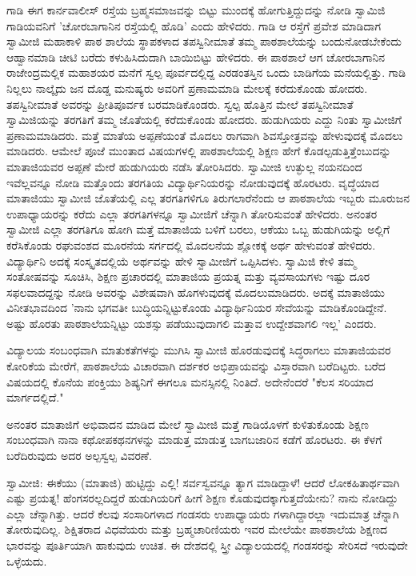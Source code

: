 ಗಾಡಿ ಈಗ ಕಾರ್ನವಾಲೀಸ್ ರಸ್ತೆಯ ಬ್ರಹ್ಮಸಮಾಜವನ್ನು ಬಿಟ್ಟು ಮುಂದಕ್ಕೆ ಹೋಗುತ್ತಿದ್ದುದನ್ನು ನೋಡಿ ಸ್ವಾಮಿಜಿ ಗಾಡಿಯವನಿಗೆ 'ಚೋರಬಾಗಾನಿನ ರಸ್ತೆಯಲ್ಲಿ ಹೊಡಿ' ಎಂದು ಹೇಳಿದರು. ಗಾಡಿ ಆ ರಸ್ತೆಗೆ ಪ್ರವೇಶ ಮಾಡಿದಾಗ ಸ್ವಾಮೀಜಿ ಮಹಾಕಾಳಿ ಪಾಠ ಶಾಲೆಯ ಸ್ಥಾಪಕಳಾದ ತಪಸ್ವಿನೀಮಾತೆ ತಮ್ಮ ಪಾಠಶಾಲೆಯನ್ನು ಬಂದುನೋಡಬೇಕೆಂದು ಆಹ್ವಾನಮಾಡಿ ಚೀಟಿ ಬರೆದು ಕಳುಹಿಸಿದುದಾಗಿ ಬಾಯಿಬಿಟ್ಟು ಹೇಳಿದರು. ಈ ಪಾಠಶಾಲೆ ಆಗ ಚೋರಬಾಗಾನಿನ ರಾಜೇಂದ್ರಮಲ್ಲಿಕ ಮಹಾಶಯರ ಮನೆಗೆ ಸ್ವಲ್ಪ ಪೂರ್ವದಲ್ಲಿದ್ದ ಎರಡಂತಸ್ತಿನ ಒಂದು ಬಾಡಿಗೆಯ ಮನೆಯಲ್ಲಿತ್ತು. ಗಾಡಿ ನಿಲ್ಲಲು ನಾಲ್ಕೈದು ಜನ ದೊಡ್ಡ ಮನುಷ್ಯರು ಅವರಿಗೆ ಪ್ರಣಾಮಮಾಡಿ ಮೇಲಕ್ಕೆ ಕರೆದುಕೊಂಡು ಹೋದರು. ತಪಸ್ವಿನೀಮಾತೆ ಅವರನ್ನು ಪ್ರೀತಿಪೂರ್ವಕ ಬರಮಾಡಿಕೊಂಡರು. ಸ್ವಲ್ಪ ಹೊತ್ತಿನ ಮೇಲೆ ತಪಸ್ವಿನೀಮಾತೆ ಸ್ವಾಮಿಜಿಯನ್ನು ತರಗತಿಗೆ ತಮ್ಮ ಜೊತೆಯಲ್ಲಿ ಕರೆದುಕೊಂಡು ಹೋದರು. ಹುಡುಗಿಯರು ಎದ್ದು ನಿಂತು ಸ್ವಾಮೀಜಿಗೆ ಪ್ರಣಾಮಮಾಡಿದರು. ಮತ್ತೆ ಮಾತೆಯ ಅಪ್ಪಣೆಯಂತೆ ಮೊದಲು ರಾಗವಾಗಿ ಶಿವಸ್ತೋತ್ರವನ್ನು ಹೇಳುವುದಕ್ಕೆ ಮೊದಲು ಮಾಡಿದರು. ಆಮೇಲೆ ಪೂಜೆ ಮುಂತಾದ ವಿಷಯಗಳಲ್ಲಿ ಪಾಠಶಾಲೆಯಲ್ಲಿ ಶಿಕ್ಷಣ ಹೇಗೆ ಕೊಡಲ್ಪಡುತ್ತಿತ್ತೆಂಬುದನ್ನು ಮಾತಾಜಿಯವರ ಅಪ್ಪಣೆ ಮೇರೆ ಹುಡುಗಿಯರು ನಡೆಸಿ ತೋರಿಸಿದರು. ಸ್ವಾಮೀಜಿ ಉತ್ಫುಲ್ಲ ನಯನದಿಂದ ಇವೆಲ್ಲವನ್ನೂ ನೋಡಿ ಮತ್ತೊಂದು ತರಗತಿಯ ವಿದ್ಯಾರ್ಥಿನಿಯರನ್ನು ನೋಡುವುದಕ್ಕೆ ಹೊರಟರು. ವೃದ್ಧೆಯಾದ ಮಾತಾಜಿಯು ಸ್ವಾಮೀಜಿ ಜೊತೆಯಲ್ಲಿ ಎಲ್ಲ ತರಗತಿಗಳಿಗೂ ತಿರುಗಲಾರೆನೆಂದು ಆ ಪಾಠಶಾಲೆಯ ಇಬ್ಬರು ಮೂರುಜನ ಉಪಾಧ್ಯಾಯರನ್ನು ಕರೆದು ಎಲ್ಲಾ ತರಗತಿಗಳನ್ನೂ ಸ್ವಾಮೀಜಿಗೆ ಚೆನ್ನಾಗಿ ತೋರಿಸುವಂತೆ ಹೇಳಿದರು. ಅನಂತರ ಸ್ವಾಮೀಜಿ ಎಲ್ಲಾ ತರಗತಿಗೂ ಹೋಗಿ ಮತ್ತೆ ಮಾತಾಜಿಯ ಬಳಿಗೆ ಬರಲು, ಆಕೆಯು ಒಬ್ಬ ಹುಡುಗಿಯನ್ನು ಅಲ್ಲಿಗೆ ಕರೆಸಿಕೊಂಡು ರಘುವಂಶದ ಮೂರನೆಯ ಸರ್ಗದಲ್ಲಿ ಮೊದಲನೆಯ ಶ್ಲೋಕಕ್ಕೆ ಅರ್ಥ ಹೇಳುವಂತೆ ಹೇಳಿದರು. ವಿದ್ಯಾರ್ಥಿನಿ ಅದಕ್ಕೆ ಸಂಸ್ಕೃತದಲ್ಲಿಯೆ ಅರ್ಥವನ್ನು ಹೇಳಿ ಸ್ವಾಮೀಜಿಗೆ ಒಪ್ಪಿಸಿದಳು. ಸ್ವಾಮಿಜಿ ಕೇಳಿ ತಮ್ಮ ಸಂತೋಷವನ್ನು ಸೂಚಿಸಿ, ಶಿಕ್ಷಣ ಪ್ರಚಾರದಲ್ಲಿ ಮಾತಾಜಿಯ ಪ್ರಯತ್ನ ಮತ್ತು ವ್ಯವಸಾಯಗಳು ಇಷ್ಟು ದೂರ ಸಫಲವಾದದ್ದನ್ನು ನೋಡಿ ಅವರನ್ನು ವಿಶೇಷವಾಗಿ ಹೊಗಳುವುದಕ್ಕೆ ಮೊದಲುಮಾಡಿದರು. ಅದಕ್ಕೆ ಮಾತಾಜಿಯು ವಿನೀತಭಾವದಿಂದ 'ನಾನು ಭಗವತೀ ಬುದ್ಧಿಯನ್ನಿಟ್ಟುಕೊಂಡು ವಿದ್ಯಾರ್ಥಿನಿಯರ ಸೇವೆಯನ್ನು ಮಾಡಿಕೊಂಡಿದ್ದೇನೆ. ಅಷ್ಟು ಹೊರತು ಪಾಠಶಾಲೆಯನ್ನಿಟ್ಟು ಯಶಸ್ಸು ಪಡೆಯುವುದಾಗಲಿ ಮತ್ತಾವ ಉದ್ದೇಶವಾಗಲಿ ಇಲ್ಲ' ಎಂದರು.

ವಿದ್ಯಾಲಯ ಸಂಬಂಧವಾಗಿ ಮಾತುಕತೆಗಳನ್ನು ಮುಗಿಸಿ ಸ್ವಾಮೀಜಿ ಹೊರಡುವುದಕ್ಕೆ ಸಿದ್ಧರಾಗಲು ಮಾತಾಜಿಯವರ ಕೋರಿಕೆಯ ಮೇರೆಗೆ, ಪಾಠಶಾಲೆಯ ವಿಚಾರವಾಗಿ ದರ್ಶಕರ ಅಭಿಪ್ರಾಯವನ್ನು ವಿಸ್ತಾರವಾಗಿ ಬರೆದಿಟ್ಟರು. ಬರೆದ ವಿಷಯದಲ್ಲಿ ಕೊನೆಯ ಪಂಕ್ತಿಯು ಶಿಷ್ಯನಿಗೆ ಈಗಲೂ ಮನಸ್ಸಿನಲ್ಲಿ ನಿಂತಿದೆ. ಅದೇನೆಂದರೆ "ಕೆಲಸ ಸರಿಯಾದ ಮಾರ್ಗದಲ್ಲಿದೆ."

ಅನಂತರ ಮಾತಾಜಿಗೆ ಅಭಿವಾದನ ಮಾಡಿದ ಮೇಲೆ ಸ್ವಾಮೀಜಿ ಮತ್ತೆ ಗಾಡಿಯೊಳಗೆ ಕುಳಿತುಕೊಂಡು ಶಿಕ್ಷಣ ಸಂಬಂಧವಾಗಿ ನಾನಾ ಕಥೋಪಕಥನಗಳನ್ನು ಮಾಡುತ್ತ ಮಾಡುತ್ತ ಬಾಗಬಜಾರಿನ ಕಡೆಗೆ ಹೊರಟರು. ಈ ಕೆಳಗೆ ಬರೆದಿರುವುದು ಅದರ ಅಲ್ಪಸ್ವಲ್ಪ ವಿವರಣೆ.

ಸ್ವಾಮೀಜಿ: ಈಕೆಯು (ಮಾತಾಜಿ) ಹುಟ್ಟಿದ್ದು ಎಲ್ಲಿ! ಸರ್ವಸ್ವವನ್ನೂ ತ್ಯಾಗ ಮಾಡಿದ್ದಾಳೆ! ಆದರೆ ಲೋಕಹಿತಾರ್ಥವಾಗಿ ಎಷ್ಟು ಪ್ರಯತ್ನ! ಹೆಂಗಸರಲ್ಲದಿದ್ದರೆ ಹುಡುಗಿಯರಿಗೆ ಹೀಗೆ ಶಿಕ್ಷಣ ಕೊಡುವುದಕ್ಕಾಗುತ್ತದೆಯೇನು? ನಾನು ನೋಡಿದ್ದು ಎಲ್ಲಾ ಚೆನ್ನಾಗಿತ್ತು. ಆದರೆ ಕೆಲವು ಸಂಸಾರಿಗಳಾದ ಗಂಡಸರು ಉಪಾಧ್ಯಾಯರು ಗಳಾಗಿದ್ದಾರಲ್ಲಾ ಇದುಮಾತ್ರ ಚೆನ್ನಾಗಿ ತೋರುವುದಿಲ್ಲ. ಶಿಕ್ಷಿತರಾದ ವಿಧವೆಯರು ಮತ್ತು ಬ್ರಹ್ಮಚಾರಿಣಿಯರು ಇವರ ಮೇಲೆಯೇ ಪಾಠಶಾಲೆಯ ಶಿಕ್ಷಣದ ಭಾರವನ್ನು ಪೂರ್ತಿಯಾಗಿ ಹಾಕುವುದು ಉಚಿತ. ಈ ದೇಶದಲ್ಲಿ ಸ್ತ್ರೀ ವಿದ್ಯಾಲಯದಲ್ಲಿ ಗಂಡಸರನ್ನು ಸೇರಿಸದೆ ಇರುವುದೇ ಒಳ್ಳೆಯದು.

